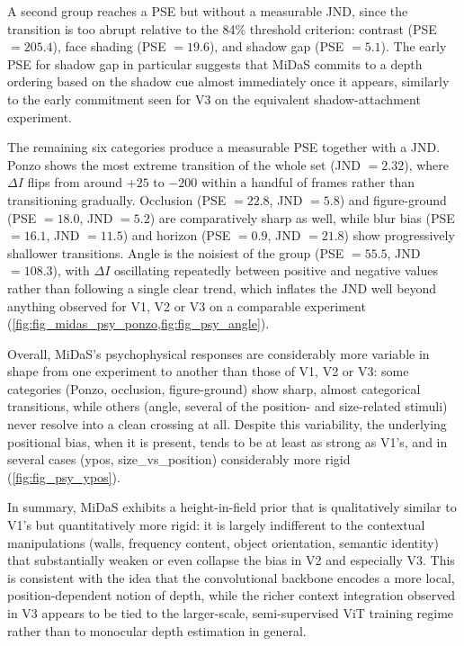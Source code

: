 \documentclass[10pt,twocolumn]{article}
\begin{document}
A second group reaches a PSE but without a measurable JND, since the transition is too
abrupt relative to the 84\% threshold criterion: contrast (PSE $=205.4$), face shading
(PSE $=19.6$), and shadow gap (PSE $=5.1$). The early PSE for shadow gap in particular
suggests that MiDaS commits to a depth ordering based on the shadow cue almost
immediately once it appears, similarly to the early commitment seen for V3 on the
equivalent shadow-attachment experiment.

The remaining six categories produce a measurable PSE together with a JND. Ponzo shows
the most extreme transition of the whole set (JND $= 2.32$), where $\Delta I$ flips from
around $+25$ to $-200$ within a handful of frames rather than transitioning gradually.
Occlusion (PSE $=22.8$, JND $=5.8$) and figure-ground (PSE $=18.0$, JND $=5.2$) are
comparatively sharp as well, while blur bias (PSE $=16.1$, JND $=11.5$) and horizon
(PSE $=0.9$, JND $=21.8$) show progressively shallower transitions. Angle is the
noisiest of the group (PSE $=55.5$, JND $=108.3$), with $\Delta I$ oscillating
repeatedly between positive and negative values rather than following a single clear
trend, which inflates the JND well beyond anything observed for V1, V2 or V3 on a
comparable experiment (\cref{fig:fig_midas_psy_ponzo,fig:fig_psy_angle}).

Overall, MiDaS's psychophysical responses are considerably more variable in shape from
one experiment to another than those of V1, V2 or V3: some categories (Ponzo, occlusion,
figure-ground) show sharp, almost categorical transitions, while others (angle, several
of the position- and size-related stimuli) never resolve into a clean crossing at all.
Despite this variability, the underlying positional bias, when it is present, tends to be
at least as strong as V1's, and in several cases (ypos, size\_vs\_position) considerably
more rigid (\cref{fig:fig_psy_ypos}).

In summary, MiDaS exhibits a height-in-field prior that is qualitatively similar
to V1's but quantitatively more rigid: it is largely indifferent to the contextual
manipulations (walls, frequency content, object orientation, semantic identity)
that substantially weaken or even collapse the bias in V2 and especially V3. This
is consistent with the idea that the convolutional backbone encodes a more local,
position-dependent notion of depth, while the richer context integration observed
in V3 appears to be tied to the larger-scale, semi-supervised ViT training regime
rather than to monocular depth estimation in general.
\end{document}
